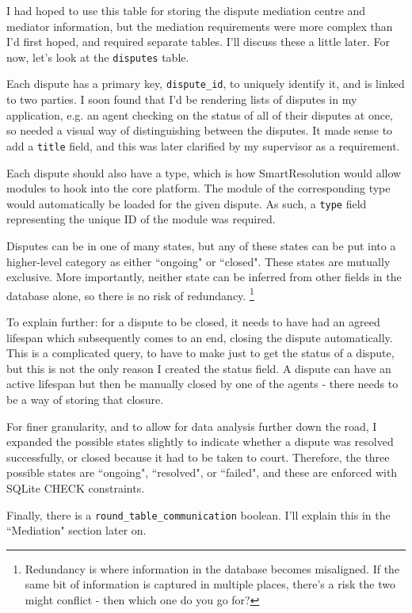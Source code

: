 I had hoped to use this table for storing the dispute mediation centre and mediator information, but the mediation requirements were more complex than I'd first hoped, and required separate tables. I'll discuss these a little later. For now, let's look at the \lstinline{disputes} table.

Each dispute has a primary key, \lstinline{dispute_id}, to uniquely identify it, and is linked to two parties. I soon found that I'd be rendering lists of disputes in my application, e.g. an agent checking on the status of all of their disputes at once, so needed a visual way of distinguishing between the disputes. It made sense to add a \lstinline{title} field, and this was later clarified by my supervisor as a requirement.

Each dispute should also have a type, which is how SmartResolution would allow modules to hook into the core platform. The module of the corresponding type would automatically be loaded for the given dispute. As such, a \lstinline{type} field representing the unique ID of the module was required.

Disputes can be in one of many states, but any of these states can be put into a higher-level category as either ``ongoing" or ``closed". These states are mutually exclusive. More importantly, neither state can be inferred from other fields in the database alone, so
there is no risk of redundancy. \footnote{Redundancy is where information in the database becomes misaligned. If the same bit of information is captured in multiple places, there's a risk the two might conflict - then which one do you go for?}

To explain further: for a dispute to be closed, it needs to have had an agreed lifespan which subsequently comes to an end, closing the dispute automatically. This is a complicated query, to have to make just to get the status of a dispute, but this is not the only reason I created the status field. A dispute can have an active lifespan but then be manually closed by one of the agents - there needs to be a way of storing that closure.

For finer granularity, and to allow for data analysis further down the road, I expanded the possible states slightly to indicate whether a dispute was resolved successfully, or closed because it had to be taken to court. Therefore, the three possible states are ``ongoing", ``resolved", or ``failed", and these are enforced with SQLite CHECK constraints.

Finally, there is a \lstinline{round_table_communication} boolean. I'll explain this in the ``Mediation" section later on.

